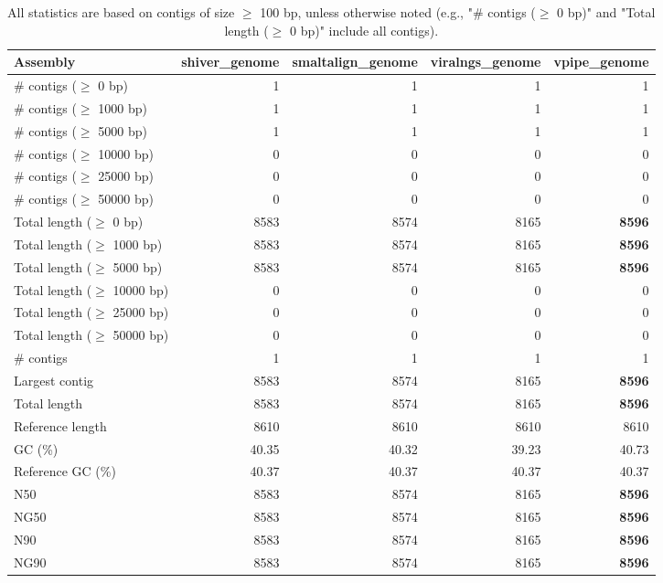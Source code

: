 \documentclass[12pt,a4paper]{article}
\begin{document}
\begin{table}[ht]
\begin{center}
\caption{All statistics are based on contigs of size $\geq$ 100 bp, unless otherwise noted (e.g., "\# contigs ($\geq$ 0 bp)" and "Total length ($\geq$ 0 bp)" include all contigs).}
\begin{tabular}{|l*{4}{|r}|}
\hline
Assembly & shiver\_genome & smaltalign\_genome & viralngs\_genome & vpipe\_genome \\ \hline
\# contigs ($\geq$ 0 bp) & 1 & 1 & 1 & 1 \\ \hline
\# contigs ($\geq$ 1000 bp) & 1 & 1 & 1 & 1 \\ \hline
\# contigs ($\geq$ 5000 bp) & 1 & 1 & 1 & 1 \\ \hline
\# contigs ($\geq$ 10000 bp) & 0 & 0 & 0 & 0 \\ \hline
\# contigs ($\geq$ 25000 bp) & 0 & 0 & 0 & 0 \\ \hline
\# contigs ($\geq$ 50000 bp) & 0 & 0 & 0 & 0 \\ \hline
Total length ($\geq$ 0 bp) & 8583 & 8574 & 8165 & {\bf 8596} \\ \hline
Total length ($\geq$ 1000 bp) & 8583 & 8574 & 8165 & {\bf 8596} \\ \hline
Total length ($\geq$ 5000 bp) & 8583 & 8574 & 8165 & {\bf 8596} \\ \hline
Total length ($\geq$ 10000 bp) & 0 & 0 & 0 & 0 \\ \hline
Total length ($\geq$ 25000 bp) & 0 & 0 & 0 & 0 \\ \hline
Total length ($\geq$ 50000 bp) & 0 & 0 & 0 & 0 \\ \hline
\# contigs & 1 & 1 & 1 & 1 \\ \hline
Largest contig & 8583 & 8574 & 8165 & {\bf 8596} \\ \hline
Total length & 8583 & 8574 & 8165 & {\bf 8596} \\ \hline
Reference length & 8610 & 8610 & 8610 & 8610 \\ \hline
GC (\%) & 40.35 & 40.32 & 39.23 & 40.73 \\ \hline
Reference GC (\%) & 40.37 & 40.37 & 40.37 & 40.37 \\ \hline
N50 & 8583 & 8574 & 8165 & {\bf 8596} \\ \hline
NG50 & 8583 & 8574 & 8165 & {\bf 8596} \\ \hline
N90 & 8583 & 8574 & 8165 & {\bf 8596} \\ \hline
NG90 & 8583 & 8574 & 8165 & {\bf 8596} \\ \hline

\end{tabular}
\end{center}
\end{table}
\end{document}
